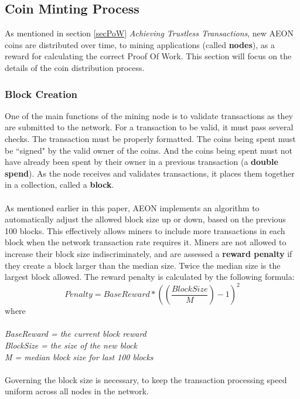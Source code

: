 \subsection{Coin Minting Process}
As mentioned in section \ref{secPoW} \textit{Achieving Trustless Transactions}, new AEON coins are distributed over time, to mining applications (called \textbf{nodes}), as a reward for calculating the correct Proof Of Work. This section will focus on the details of the coin distribution process.

\subsubsection{Block Creation}
One of the main functions of the mining node is to validate transactions as they are submitted to the network. For a transaction to be valid, it must pass several checks. The transaction must be properly formatted. The coins being spent must be “signed" by the valid owner of the coins. And the coins being spent must not have already been spent by their owner in a previous transaction (a \textbf{double spend}). As the node receives and validates transactions, it places them together in a collection, called a \textbf{block}.\\
\\
As mentioned earlier in this paper, AEON implements an algorithm to automatically adjust the allowed block size up or down, based on the previous 100 blocks.  This effectively allows miners to include more transactions in each block when the network transaction rate requires it. Miners are not allowed to increase their block size indiscriminately, and are assessed a \textbf{reward penalty} if they create a block larger than the median size. Twice the median size is the largest block allowed. The reward penalty is calculated by the following formula:
\begin{equation*}
Penalty = BaseReward * ( (\frac{BlockSize}{M}) - 1 )^2 
\end{equation*}
where\\
\\
\textit{
BaseReward = the current block reward\\
BlockSize = the size of the new block\\
M = median block size for last 100 blocks}\\
\\
Governing the block size is necessary, to keep the transaction processing speed uniform across all nodes in the network.

